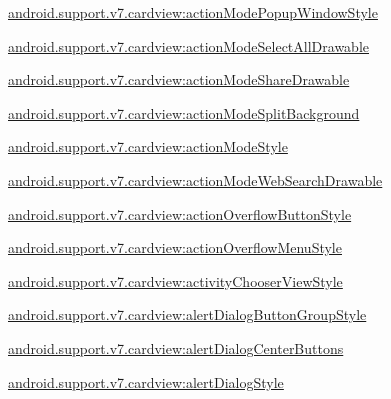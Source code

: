 {\ttfamily \hyperlink{classandroid_1_1support_1_1v7_1_1cardview_1_1R_1_1styleable_aa231285ac74ab42e147ca4b9661753bf}{android.\+support.\+v7.\+cardview\+:action\+Mode\+Popup\+Window\+Style}}

{\ttfamily \hyperlink{classandroid_1_1support_1_1v7_1_1cardview_1_1R_1_1styleable_ab0297c0ea60fe49a756d7ab2b43f0378}{android.\+support.\+v7.\+cardview\+:action\+Mode\+Select\+All\+Drawable}}

{\ttfamily \hyperlink{classandroid_1_1support_1_1v7_1_1cardview_1_1R_1_1styleable_acdce974dcac87ee093ecef92f712b8dc}{android.\+support.\+v7.\+cardview\+:action\+Mode\+Share\+Drawable}}

{\ttfamily \hyperlink{classandroid_1_1support_1_1v7_1_1cardview_1_1R_1_1styleable_a99300a8012a768bb28bea139da6de52e}{android.\+support.\+v7.\+cardview\+:action\+Mode\+Split\+Background}}

{\ttfamily \hyperlink{classandroid_1_1support_1_1v7_1_1cardview_1_1R_1_1styleable_a50c09e1d32d726cfef89e5ad6164aac9}{android.\+support.\+v7.\+cardview\+:action\+Mode\+Style}}

{\ttfamily \hyperlink{classandroid_1_1support_1_1v7_1_1cardview_1_1R_1_1styleable_abebfa202c2e142724eca48f1c73fdd66}{android.\+support.\+v7.\+cardview\+:action\+Mode\+Web\+Search\+Drawable}}

{\ttfamily \hyperlink{classandroid_1_1support_1_1v7_1_1cardview_1_1R_1_1styleable_ab6fbca9d79a6ce0b5d32ae5bec46bb2f}{android.\+support.\+v7.\+cardview\+:action\+Overflow\+Button\+Style}}

{\ttfamily \hyperlink{classandroid_1_1support_1_1v7_1_1cardview_1_1R_1_1styleable_af2526f4e27bf70cfd50bef8645b28ceb}{android.\+support.\+v7.\+cardview\+:action\+Overflow\+Menu\+Style}}

{\ttfamily \hyperlink{classandroid_1_1support_1_1v7_1_1cardview_1_1R_1_1styleable_ab298049998a791e2af26b0dc51e76b10}{android.\+support.\+v7.\+cardview\+:activity\+Chooser\+View\+Style}}

{\ttfamily \hyperlink{classandroid_1_1support_1_1v7_1_1cardview_1_1R_1_1styleable_ac3a18c29d8fce9bf5c1b142f1a07e531}{android.\+support.\+v7.\+cardview\+:alert\+Dialog\+Button\+Group\+Style}}

{\ttfamily \hyperlink{classandroid_1_1support_1_1v7_1_1cardview_1_1R_1_1styleable_af83656dc4de3b9d3f32fcd07ff7b8892}{android.\+support.\+v7.\+cardview\+:alert\+Dialog\+Center\+Buttons}}

{\ttfamily \hyperlink{classandroid_1_1support_1_1v7_1_1cardview_1_1R_1_1styleable_a09318e393d7df2f7968716e2d1c1a214}{android.\+support.\+v7.\+cardview\+:alert\+Dialog\+Style}}

